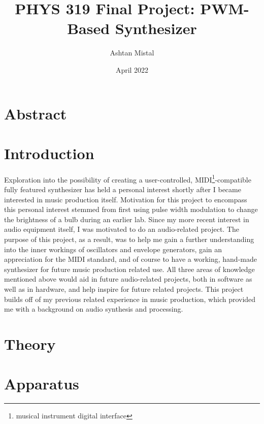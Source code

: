 \documentclass[10pt]{article}
\title{PHYS 319 Final Project: PWM-Based Synthesizer}
\author{Ashtan Mistal}
\date{April 2022}
\begin{document}
\maketitle

\break

\tableofcontents{}

\break

\section{Abstract}\label{sec:abstract}


\section{Introduction}\label{sec:introduction}

Exploration into the possibility of creating a user-controlled, MIDI\footnote{musical instrument digital interface}-compatible fully featured synthesizer has held a personal interest shortly after I became interested in music production itself.
Motivation for this project to encompass this personal interest stemmed from first using pulse width modulation to change the brightness of a bulb during an earlier lab.
Since my more recent interest in audio equipment itself, I was motivated to do an audio-related project.
The purpose of this project, as a result, was to help me gain a further understanding into the inner workings of oscillators and envelope generators, gain an appreciation for the MIDI standard, and of course to have a working, hand-made synthesizer for future music production related use.
All three areas of knowledge mentioned above would aid in future audio-related projects, both in software as well as in hardware, and help inspire for future related projects.
This project builds off of my previous related experience in music production, which provided me with a background on audio synthesis and processing.

\section{Theory}\label{sec:theory}


\section{Apparatus}\label{sec:apparatus}
\end{document}
